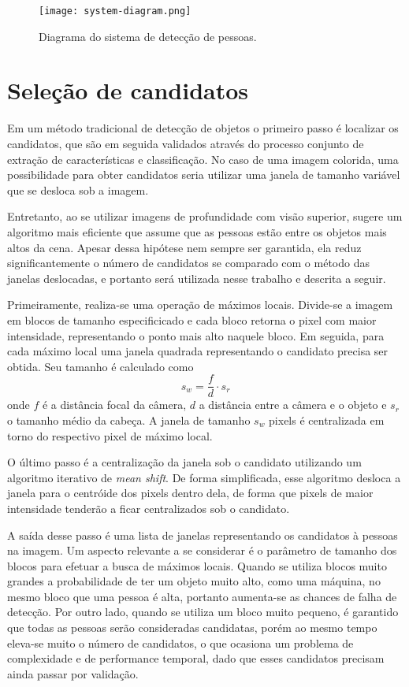   \begin{figure*}[!t]
  \centering
  \texttt{[image: system-diagram.png]}
  \caption{Diagrama do sistema de detecção de pessoas.}
  \label{fig:system-diagram}
  \end{figure*}

\section{Seleção de candidatos}
\label{sec:candidates}

    Em um método tradicional de detecção de objetos \cite{traditional-objdetect} o primeiro passo é localizar os candidatos, que são em seguida validados através do processo conjunto de extração de características e classificação. No caso de uma imagem colorida, uma possibilidade para obter candidatos seria utilizar uma janela de tamanho variável que se desloca sob a imagem.

    Entretanto, ao se utilizar imagens de profundidade com visão superior, \cite{rauter} sugere um algoritmo mais eficiente que assume que as pessoas estão entre os objetos mais altos da cena. Apesar dessa hipótese nem sempre ser garantida, ela reduz significantemente o número de candidatos se comparado com o método das janelas deslocadas, e portanto será utilizada nesse trabalho e descrita a seguir.

    Primeiramente, realiza-se uma operação de máximos locais. Divide-se a imagem em blocos de tamanho especificicado e cada bloco retorna o pixel com maior intensidade, representando o ponto mais alto naquele bloco. Em seguida, para cada máximo local uma janela quadrada representando o candidato precisa ser obtida. Seu tamanho é calculado como
    \begin{equation}
      s_w = \frac{f}{d} \cdot s_r
    \end{equation}
    onde $f$ é a distância focal da câmera, $d$ a distância entre a câmera e o objeto e $s_r$ o tamanho médio da cabeça. A janela de tamanho $s_w$ pixels é centralizada em torno do respectivo pixel de máximo local.

    O último passo é a centralização da janela sob o candidato utilizando um algoritmo iterativo de \textit{mean shift}. De forma simplificada, esse algoritmo desloca a janela para o centróide dos pixels dentro dela, de forma que pixels de maior intensidade tenderão a ficar centralizados sob o candidato.

    A saída desse passo é uma lista de janelas representando os candidatos à pessoas na imagem. Um aspecto relevante a se considerar é o parâmetro de tamanho dos blocos para efetuar a busca de máximos locais. Quando se utiliza blocos muito grandes a probabilidade de ter um objeto muito alto, como uma máquina, no mesmo bloco que uma pessoa é alta, portanto aumenta-se as chances de falha de detecção. Por outro lado, quando se utiliza um bloco muito pequeno, é garantido que todas as pessoas serão consideradas candidatas, porém ao mesmo tempo eleva-se muito o número de candidatos, o que ocasiona um problema de complexidade e de performance temporal, dado que esses candidatos precisam ainda passar por validação.

